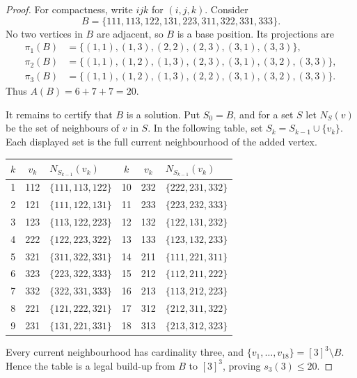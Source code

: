 \documentclass[11pt]{amsart}
\begin{document}
\begin{proof}
For compactness, write $ijk$ for $(i,j,k)$. Consider
\[
 B=\{111,113,122,131,223,311,322,331,333\}.
\]
No two vertices in $B$ are adjacent, so $B$ is a base position. Its
projections are
\begin{align*}
 \pi_1(B)&=\{(1,1),(1,3),(2,2),(2,3),(3,1),(3,3)\},\\
 \pi_2(B)&=\{(1,1),(1,2),(1,3),(2,3),(3,1),(3,2),(3,3)\},\\
 \pi_3(B)&=\{(1,1),(1,2),(1,3),(2,2),(3,1),(3,2),(3,3)\}.
\end{align*}
Thus $A(B)=6+7+7=20$.

It remains to certify that $B$ is a solution. Put $S_0=B$, and for a set
$S$ let $N_S(v)$ be the set of neighbours of $v$ in $S$. In the following
table, set $S_k=S_{k-1}\cup\{v_k\}$. Each displayed set is the full current
neighbourhood of the added vertex.

\begin{center}
\small
\renewcommand{\arraystretch}{1.06}
\begin{tabular}{c@{\;}c@{\;}l@{\qquad}c@{\;}c@{\;}l}
$k$ & $v_k$ & $N_{S_{k-1}}(v_k)$
& $k$ & $v_k$ & $N_{S_{k-1}}(v_k)$\\
\hline
 1 & 112 & $\{111,113,122\}$
& 10 & 232 & $\{222,231,332\}$\\
 2 & 121 & $\{111,122,131\}$
& 11 & 233 & $\{223,232,333\}$\\
 3 & 123 & $\{113,122,223\}$
& 12 & 132 & $\{122,131,232\}$\\
 4 & 222 & $\{122,223,322\}$
& 13 & 133 & $\{123,132,233\}$\\
 5 & 321 & $\{311,322,331\}$
& 14 & 211 & $\{111,221,311\}$\\
 6 & 323 & $\{223,322,333\}$
& 15 & 212 & $\{112,211,222\}$\\
 7 & 332 & $\{322,331,333\}$
& 16 & 213 & $\{113,212,223\}$\\
 8 & 221 & $\{121,222,321\}$
& 17 & 312 & $\{212,311,322\}$\\
 9 & 231 & $\{131,221,331\}$
& 18 & 313 & $\{213,312,323\}$
\end{tabular}
\end{center}

Every current neighbourhood has cardinality three, and
$\{v_1,\ldots,v_{18}\}=[3]^3\setminus B$. Hence the table is a legal
build-up from $B$ to $[3]^3$, proving $s_3(3)\le20$.


\end{proof}
\end{document}
